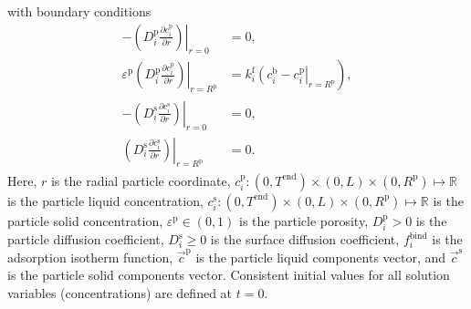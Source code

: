 \documentclass{article}
\begin{document}
with boundary conditions
\begin{align}
- \left. \left( D^{\mathrm{p}}_{i} \frac{\partial c^{\mathrm{p}}_{i}}{\partial r} \right) \right|_{r=0}
&= 0, \\
\varepsilon^{\mathrm{p}} \left. \left( D^{\mathrm{p}}_{i} \frac{\partial c^{\mathrm{p}}_{i}}{\partial r} \right)\right|_{r = R^{\mathrm{p}}_{}}
               &= k^{\mathrm{f}}_{i} \left. \left( c^{\mathrm{b}}_i - c^{\mathrm{p}}_{i} \right|_{r = R^{\mathrm{p}}_{}} \right),\\
-\left( \left. D^{\mathrm{s}}_{i} \frac{\partial c^{\mathrm{s}}_{i}}{\partial r} \right) \right|_{r=0}
&= 0, \\
\left( \left. D^{\mathrm{s}}_{i} \frac{\partial c^{\mathrm{s}}_{i}}{\partial r} \right) \right|_{r = R^{\mathrm{p}}_{}}
&= 0.
\end{align}
Here, $r$ is the radial particle coordinate, $c^{\mathrm{p}}_{i}\colon  (0, T^\mathrm{end}) \times (0, L)\times (0, R^{\mathrm{p}}) \mapsto \mathbb{R}$ is the particle liquid concentration, $c^{\mathrm{s}}_{i}\colon  (0, T^\mathrm{end}) \times (0, L)\times (0, R^{\mathrm{p}}) \mapsto \mathbb{R}$ is the particle solid concentration, $\varepsilon^{\mathrm{p}}\in (0, 1)$ is the particle porosity, $D^\mathrm{p}_{i}> 0$ is the particle diffusion coefficient, $D^\mathrm{s}_{i}\geq 0$ is the surface diffusion coefficient, $f^\mathrm{bind}_{i}$ is the adsorption isotherm function, $\vec{c}^\mathrm{p}$ is the particle liquid components vector, and $\vec{c}^\mathrm{s}$ is the particle solid components vector.
Consistent initial values for all solution variables (concentrations) are defined at $t = 0$.
\end{document}
